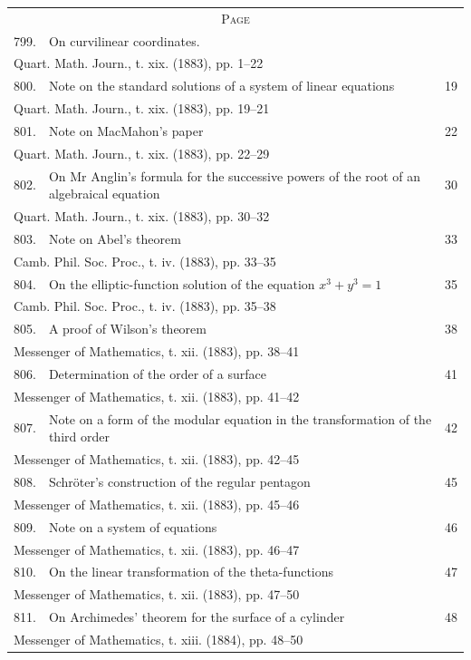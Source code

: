 \documentclass[11pt,a4paper]{book}
\begin{document}
\noindent
\begin{tabular}{@{}r@{\quad}p{8cm}@{\quad}r@{}}
\multicolumn{3}{c}{\scshape Page}\\[2mm]
799. & On curvilinear coordinates. & \\
\multicolumn{3}{l}{\quad Quart. Math. Journ., t. xix. (1883), pp. 1--22}\\[1mm]
800. & Note on the standard solutions of a system of linear equations & 19 \\
\multicolumn{3}{l}{\quad Quart. Math. Journ., t. xix. (1883), pp. 19--21}\\[1mm]
801. & Note on MacMahon's paper & 22 \\
\multicolumn{3}{l}{\quad Quart. Math. Journ., t. xix. (1883), pp. 22--29}\\[1mm]
802. & On Mr Anglin's formula for the successive powers of the root of an algebraical equation & 30 \\
\multicolumn{3}{l}{\quad Quart. Math. Journ., t. xix. (1883), pp. 30--32}\\[1mm]
803. & Note on Abel's theorem & 33 \\
\multicolumn{3}{l}{\quad Camb. Phil. Soc. Proc., t. iv. (1883), pp. 33--35}\\[1mm]
804. & On the elliptic-function solution of the equation $x^3 + y^3 = 1$ & 35 \\
\multicolumn{3}{l}{\quad Camb. Phil. Soc. Proc., t. iv. (1883), pp. 35--38}\\[1mm]
805. & A proof of Wilson's theorem & 38 \\
\multicolumn{3}{l}{\quad Messenger of Mathematics, t. xii. (1883), pp. 38--41}\\[1mm]
806. & Determination of the order of a surface & 41 \\
\multicolumn{3}{l}{\quad Messenger of Mathematics, t. xii. (1883), pp. 41--42}\\[1mm]
807. & Note on a form of the modular equation in the transformation of the third order & 42 \\
\multicolumn{3}{l}{\quad Messenger of Mathematics, t. xii. (1883), pp. 42--45}\\[1mm]
808. & Schr\"{o}ter's construction of the regular pentagon & 45 \\
\multicolumn{3}{l}{\quad Messenger of Mathematics, t. xii. (1883), pp. 45--46}\\[1mm]
809. & Note on a system of equations & 46 \\
\multicolumn{3}{l}{\quad Messenger of Mathematics, t. xii. (1883), pp. 46--47}\\[1mm]
810. & On the linear transformation of the theta-functions & 47 \\
\multicolumn{3}{l}{\quad Messenger of Mathematics, t. xii. (1883), pp. 47--50}\\[1mm]
811. & On Archimedes' theorem for the surface of a cylinder & 48 \\
\multicolumn{3}{l}{\quad Messenger of Mathematics, t. xiii. (1884), pp. 48--50}\\[1mm]
\end{tabular}
\cleardoublepage
\end{document}
